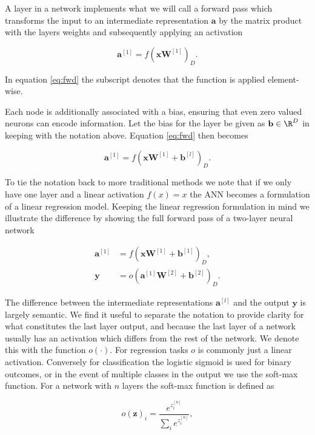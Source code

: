 A layer in a network implements what we will call a forward pass which transforms the input to an intermediate representation $\mathbf{a}$ by the matrix product with the layers weights and subsequently applying an activation 

\begin{equation}\label{eq:fwd}
	\mathbf{a}^{[1]} = f(\mathbf{x}\mathbf{W}^{[1]})_D.
\end{equation}

\noindent In equation \ref{eq:fwd} the subscript denotes that the function is applied element-wise. 

Each node is additionally associated with a bias, ensuring that even zero valued neurons can encode information. Let the bias for the layer be given as $\mathbf{b} \in \R^D$ in keeping with the notation above. Equation \ref{eq:fwd} then becomes

\begin{equation}\label{eq:fwd_b}
	\mathbf{a}^{[1]} = f(\mathbf{x}\mathbf{W}^{[1]} + \mathbf{b}^{[l]})_D.
\end{equation}

\noindent To tie the notation back to more traditional methods we note that if we only have one layer and a linear activation $f(x) = x$ the ANN becomes a formulation of a linear regression model. Keeping the linear regression formulation in mind we illustrate the difference by showing the full forward pass of a two-layer neural network

\begin{align}
\mathbf{a}^{[1]} &= f(\mathbf{x}\mathbf{W}^{[1]}+ \mathbf{b}^{[1]})_D , \\
\mathbf{y} &= o(\mathbf{a}^{[1]}\mathbf{W}^{[2]} + \mathbf{b}^{[2]})_D .
\end{align}  

\noindent The difference between the intermediate representations $\mathbf{a}^{[l]}$ and the output $\mathbf{y}$ is largely semantic. We find it useful to separate the notation to provide clarity for what constitutes the last layer output, and because the last layer of a network usually has an activation which differs from the rest of the network. We denote this with the function $o(\cdot)$. For regression tasks $o$ is commonly just a linear activation. Conversely for classification the logistic sigmoid is used for binary outcomes, or in the event of multiple classes in the output we use the soft-max function. For a network with $n$ layers the soft-max function is defined as 

\begin{equation}\label{eq:softmax}
o(\mathbf{z})_i = \frac{e^{z_i^{[n]}}}{\sum_i e^{z_i^{[n]}}},
\end{equation}

